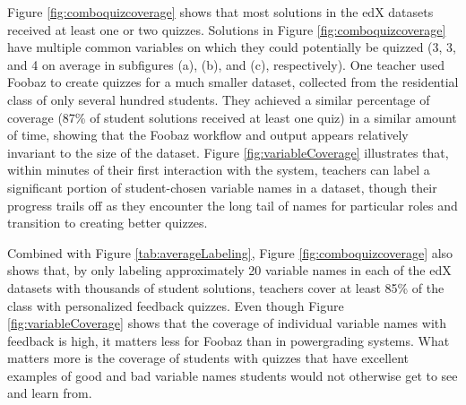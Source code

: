 Figure \ref{fig:comboquizcoverage} shows that most solutions in the edX datasets received at least one or two quizzes. Solutions in  Figure \ref{fig:comboquizcoverage} have multiple common variables on which they could potentially be quizzed (3, 3, and 4 on average in subfigures (a), (b), and (c), respectively). One teacher used Foobaz to create quizzes for a much smaller dataset, collected from the residential class of only several hundred students. They achieved a similar percentage of coverage (87\% of student solutions received at least one quiz) in a similar amount of time, showing that the Foobaz workflow and output appears relatively invariant to the size of the dataset. Figure \ref{fig:variableCoverage} illustrates that, within minutes of their first interaction with the system, teachers can label a significant portion of student-chosen variable names in a dataset, though their progress trails off as they encounter the long tail of names for particular roles and transition to creating better quizzes.

Combined with Figure \ref{tab:averageLabeling}, Figure \ref{fig:comboquizcoverage} also shows that, by only labeling approximately 20 variable names in each of the edX datasets with thousands of student solutions, teachers cover at least 85\% of the class with personalized feedback quizzes. Even though Figure \ref{fig:variableCoverage} shows that the coverage of individual variable names with feedback is high, it matters less for Foobaz than in powergrading systems. What matters more is the coverage of students with quizzes that have excellent examples of good and bad variable names students would not otherwise get to see and learn from.

